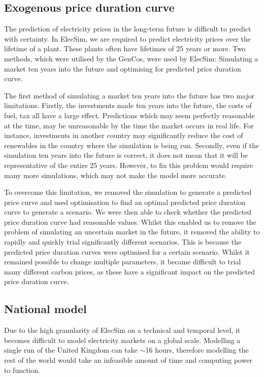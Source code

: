 \subsection*{Exogenous price duration curve}

The prediction of electricity prices in the long-term future is difficult to predict with certainty. In ElecSim, we are required to predict electricity prices over the lifetime of a plant. These plants often have lifetimes of 25 years or more. Two methods, which were utilised by the GenCos, were used by ElecSim: Simulating a market ten years into the future and optimising for predicted price duration curve.

The first method of simulating a market ten years into the future has two major limitations. Firstly, the investments made ten years into the future, the costs of fuel, tax all have a large effect. Predictions which may seem perfectly reasonable at the time, may be unreasonable by the time the market occurs in real life. For instance, investments in another country may significantly reduce the cost of renewables in the country where the simulation is being run. Secondly, even if the simulation ten years into the future is correct, it does not mean that it will be representative of the entire 25 years. However, to fix this problem would require many more simulations, which may not make the model more accurate.

To overcome this limitation, we removed the simulation to generate a predicted price curve and used optimisation to find an optimal predicted price duration curve to generate a scenario. We were then able to check whether the predicted price duration curve had reasonable values. Whilst this enabled us to remove the problem of simulating an uncertain market in the future, it removed the ability to rapidly and quickly trial significantly different scenarios. This is because the predicted price duration curves were optimised for a certain scenario. Whilst it remained possible to change multiple parameters, it became difficult to trial many different carbon prices, as these have a significant impact on the predicted price duration curve.


\subsection*{National model}

Due to the high granularity of ElecSim on a technical and temporal level, it becomes difficult to model electricity markets on a global scale. Modelling a single run of the United Kingdom can take ${\sim}$16 hours, therefore modelling the rest of the world would take an infeasible amount of time and computing power to function. 

